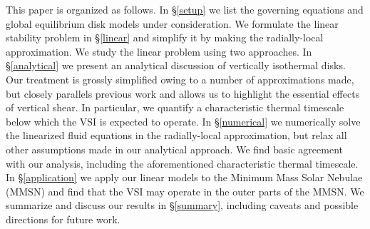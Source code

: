 \documentclass[iop]{emulateapj}
\begin{document}


This paper is organized as follows. In \S\ref{setup} we list the
governing equations and global equilibrium disk models under
consideration. We formulate the linear stability problem in
\S\ref{linear} and simplify it by making the radially-local
approximation. We study the linear problem using two approaches. In
\S\ref{analytical} we present an analytical discussion of vertically
isothermal disks. Our treatment is grossly simplified owing to a
number of approximations made, but closely parallels previous work and 
allows us to highlight the essential effects of vertical shear. In
particular, we quantify a characteristic thermal timescale below which
the VSI is expected to operate. In \S\ref{numerical} we numerically
solve the linearized fluid equations in the radially-local
approximation, but relax all other assumptions made in our analytical approach.   
We find basic agreement with our analysis, including
the aforementioned characteristic thermal timescale. In
\S\ref{application} we apply our linear models to the Minimum Mass
Solar Nebulae (MMSN) and find that the VSI may operate in the outer
parts of the MMSN. We summarize and discuss our results in
\S\ref{summary}, including caveats and possible directions for future
work.  







 


\appendix




\end{document}
